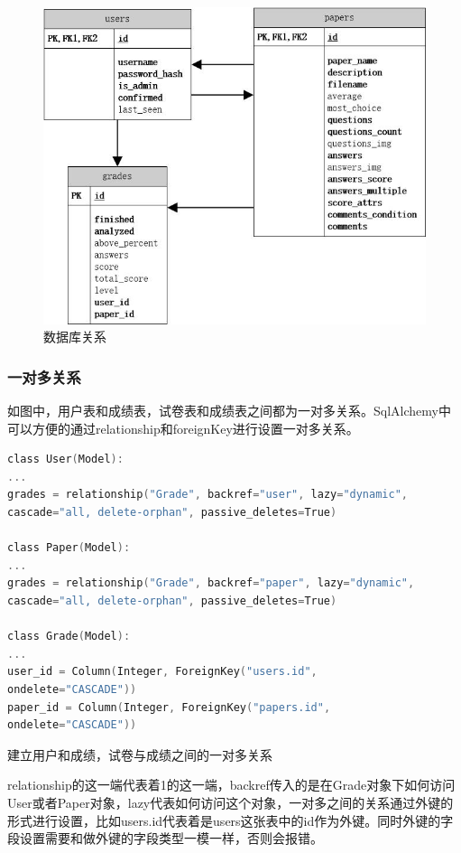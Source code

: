 \begin{figure}[thbp!]
	\centering
	\includegraphics[width=0.7\linewidth]{figure/entity_relationship}
	\caption{数据库关系}
	\label{fig:entity_relationship}
\end{figure}

\subsubsection{一对多关系}

如图中，用户表和成绩表，试卷表和成绩表之间都为一对多关系。SqlAlchemy中可以方便的通过relationship和foreignKey进行设置一对多关系。

\begin{lstlisting}[language=C]
class User(Model):
...
grades = relationship("Grade", backref="user", lazy="dynamic",
cascade="all, delete-orphan", passive_deletes=True)

class Paper(Model):
...
grades = relationship("Grade", backref="paper", lazy="dynamic",
cascade="all, delete-orphan", passive_deletes=True)

class Grade(Model):
...
user_id = Column(Integer, ForeignKey("users.id",
ondelete="CASCADE"))
paper_id = Column(Integer, ForeignKey("papers.id",
ondelete="CASCADE"))
\end{lstlisting}

\begin{center}
	{\small 建立用户和成绩，试卷与成绩之间的一对多关系}
\end{center}

relationship的这一端代表着1的这一端，backref传入的是在Grade对象下如何访问User或者Paper对象，lazy代表如何访问这个对象，一对多之间的关系通过外键的形式进行设置，比如users.id代表着是users这张表中的id作为外键。同时外键的字段设置需要和做外键的字段类型一模一样，否则会报错。

